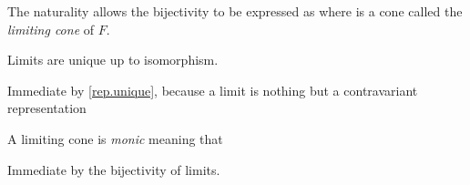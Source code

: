 \begin{definition}
\label{limiting.cone}
The naturality allows the bijectivity to be expressed as
where %
is a cone called the \emph{limiting cone} of $F$.
\end{definition}

\begin{proposition}
Limits are unique up to isomorphism.
\end{proposition}

\begin{strdproof}
Immediate by \cref{rep.unique}, because a limit is nothing but a contravariant representation
\end{strdproof}

\begin{proposition}\label{l.c.m}
A limiting cone is \emph{monic} meaning that
\end{proposition}
\begin{strdproof}
Immediate by the bijectivity of limits.
\end{strdproof}


